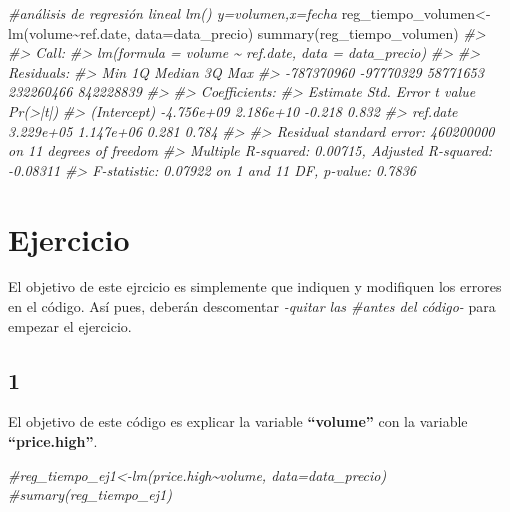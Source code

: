 \documentclass[
]{book}
\newenvironment{Shaded}{\begin{snugshade}}{\end{snugshade}}
\newcommand{\AttributeTok}[1]{\textcolor[rgb]{0.77,0.63,0.00}{#1}}
\newcommand{\CommentTok}[1]{\textcolor[rgb]{0.56,0.35,0.01}{\textit{#1}}}
\newcommand{\FunctionTok}[1]{\textcolor[rgb]{0.00,0.00,0.00}{#1}}
\newcommand{\NormalTok}[1]{#1}
\newcommand{\OtherTok}[1]{\textcolor[rgb]{0.56,0.35,0.01}{#1}}
\newcommand{\SpecialCharTok}[1]{\textcolor[rgb]{0.00,0.00,0.00}{#1}}
\begin{document}
\begin{Shaded}
\begin{Highlighting}[]
\CommentTok{\#análisis de regresión lineal lm() y=volumen,x=fecha}
\NormalTok{reg\_tiempo\_volumen}\OtherTok{\textless{}{-}}\FunctionTok{lm}\NormalTok{(volume}\SpecialCharTok{\textasciitilde{}}\NormalTok{ref.date, }\AttributeTok{data=}\NormalTok{data\_precio)}
\FunctionTok{summary}\NormalTok{(reg\_tiempo\_volumen)}
\CommentTok{\#\textgreater{} }
\CommentTok{\#\textgreater{} Call:}
\CommentTok{\#\textgreater{} lm(formula = volume \textasciitilde{} ref.date, data = data\_precio)}
\CommentTok{\#\textgreater{} }
\CommentTok{\#\textgreater{} Residuals:}
\CommentTok{\#\textgreater{}        Min         1Q     Median         3Q        Max }
\CommentTok{\#\textgreater{} {-}787370960  {-}97770329   58771653  232260466  842228839 }
\CommentTok{\#\textgreater{} }
\CommentTok{\#\textgreater{} Coefficients:}
\CommentTok{\#\textgreater{}               Estimate Std. Error t value Pr(\textgreater{}|t|)}
\CommentTok{\#\textgreater{} (Intercept) {-}4.756e+09  2.186e+10  {-}0.218    0.832}
\CommentTok{\#\textgreater{} ref.date     3.229e+05  1.147e+06   0.281    0.784}
\CommentTok{\#\textgreater{} }
\CommentTok{\#\textgreater{} Residual standard error: 460200000 on 11 degrees of freedom}
\CommentTok{\#\textgreater{} Multiple R{-}squared:  0.00715,    Adjusted R{-}squared:  {-}0.08311 }
\CommentTok{\#\textgreater{} F{-}statistic: 0.07922 on 1 and 11 DF,  p{-}value: 0.7836}
\end{Highlighting}
\end{Shaded}

\hypertarget{ejercicio}{%
\section{Ejercicio}\label{ejercicio}}

El objetivo de este ejrcicio es simplemente que indiquen y modifiquen los errores en el código. Así pues, deberán descomentar \emph{-quitar las \#antes del código-} para empezar el ejercicio.

\hypertarget{section}{%
\subsection{1}\label{section}}

El objetivo de este código es explicar la variable \textbf{``volume''} con la variable \textbf{``price.high''}.

\begin{Shaded}
\begin{Highlighting}[]
\CommentTok{\#reg\_tiempo\_ej1\textless{}{-}lm(price.high\textasciitilde{}volume, data=data\_precio)}
\CommentTok{\#sumary(reg\_tiempo\_ej1)}
\end{Highlighting}
\end{Shaded}
\end{document}
